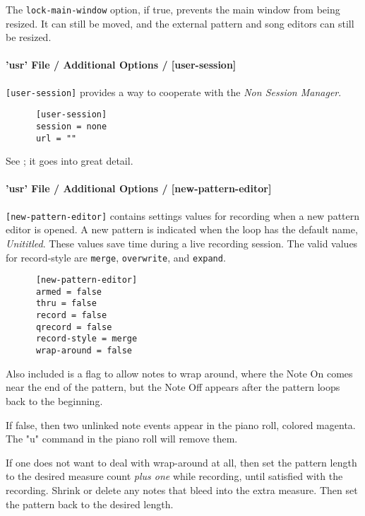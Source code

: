    The \texttt{lock-main-window} option, if true, prevents the main window from
   being resized.  It can still be moved, and the external pattern and song
   editors can still be resized.

\paragraph{'usr' File / Additional Options / [user-session]}
\label{paragraph:user_file_added_options_session}

   \texttt{[user-session]} provides a way to cooperate with the
   \textsl{Non Session Manager}.

   \begin{verbatim}
      [user-session]
      session = none
      url = ""
   \end{verbatim}

   See ; it goes into great
   detail.

\paragraph{'usr' File / Additional Options / [new-pattern-editor]}
\label{paragraph:user_file_added_options_pattern_editor}

   \texttt{[new-pattern-editor]} contains settings values for recording
    when a new pattern editor is opened. A new pattern is indicated when
   the loop has the default name, \textsl{Unititled}.
    These values save time during a live recording session.
   The valid values for record-style are \texttt{merge},
    \texttt{overwrite}, and \texttt{expand}.

   \begin{verbatim}
      [new-pattern-editor]
      armed = false
      thru = false
      record = false
      qrecord = false
      record-style = merge
      wrap-around = false
   \end{verbatim}

   Also included is a flag to allow notes to wrap around, where the Note On
   comes near the end of the pattern, but the Note Off appears after the
   pattern loops back to the beginning.

   If false, then two unlinked note events appear in the piano roll, colored
   magenta.  The "u" command in the piano roll will remove them.

   If one does not want to deal with wrap-around at all, then set the pattern
   length to the desired measure count \textsl{plus one} while recording, until
   satisfied with the recording.  Shrink or delete any notes that bleed into
   the extra measure. Then set the pattern back to the desired length.

